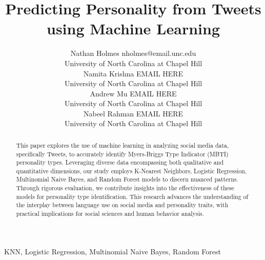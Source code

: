 \documentclass[twoside,11pt]{article}
\begin{document}
\title{Predicting Personality from Tweets using Machine Learning}

\author{\name Nathan Holmes \email nholmes@email.unc.edu \\
       \addr University of North Carolina at Chapel Hill\\
       \AND
       \name Namita Krishna \email EMAIL HERE \\
       \addr University of North Carolina at Chapel Hill\\
       \AND
       \name Andrew Mu \email EMAIL HERE \\
       \addr University of North Carolina at Chapel Hill\\
       \AND
       \name Nabeel Rahman \email EMAIL HERE \\
       \addr University of North Carolina at Chapel Hill\\
       }

\maketitle

\begin{abstract}%
This paper explores the use of machine learning in analyzing social media data, specifically Tweets, to accurately identify Myers-Briggs Type Indicator (MBTI) personality types. Leveraging diverse data encompassing both qualitative and quantitative dimensions, our study employs K-Nearest Neighbors, Logistic Regression, Multinomial Naive Bayes, and Random Forest models to discern nuanced patterns. Through rigorous evaluation, we contribute insights into the effectiveness of these models for personality type identification. This research advances the understanding of the interplay between language use on social media and personality traits, with practical implications for social sciences and human behavior analysis.
\end{abstract}

\begin{keywords}
  KNN, Logistic Regression, Multinomial Naive Bayes, Random Forest
\end{keywords}
\end{document}
